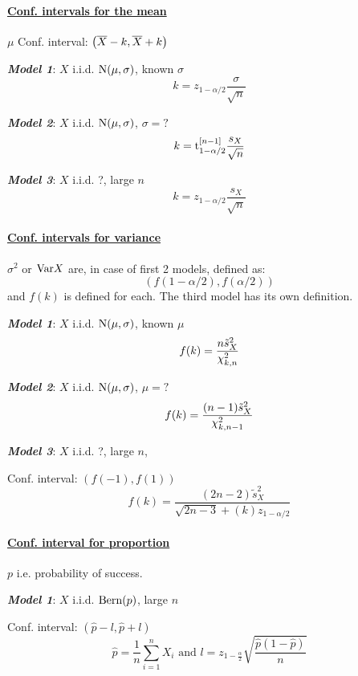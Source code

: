 \paragraph{\underline{Conf. intervals for the mean}}
$\mu$ \hspace{0pt} \newline
Conf. interval: $ \left( \overline{X} - k, \overline{X} + k \right) $

\vspace{5pt} \noindent \textbf{\em Model 1}:
$X$ i.i.d. $\textrm{N}(\mu, \sigma)$, known $\sigma$
\[ k = z_{1-\alpha/2}\frac{\sigma}{\sqrt{n}} \]

\noindent \textbf{\em Model 2}:
$X$ i.i.d. $\textrm{N}(\mu, \sigma)$, $\sigma=?$
\[ k = \textrm{t}^{[n-1]}_{1-\alpha/2}\frac{s_X}{\sqrt{n}} \]

\noindent \textbf{\em Model 3}:
$X$ i.i.d. ?, large $n$
\[ k = z_{1-\alpha/2}\frac{s_X}{\sqrt{n}} \]

\paragraph{\underline{Conf. intervals for variance}}
$\sigma^2$ \hspace{0pt} \newline
or $\textrm{Var} X$ are, in case of first 2 models, defined as:
\[ \left( f(1-\alpha/2), f(\alpha/2) \right) \]
and $f(k)$ is defined for each. The third model has its own definition.

\vspace{5pt} \noindent \textbf{\em Model 1}:
$X$ i.i.d. $\textrm{N}(\mu, \sigma)$, known $\mu$
\[ f(k) = \frac{n\tilde{s}_X^2}{\chi^2_{k,n}} \]

\noindent \textbf{\em Model 2}:
$X$ i.i.d. $\textrm{N}(\mu, \sigma)$, $\mu=?$
\[ f(k) = \frac{(n-1)\tilde{s}_X^2}{\chi^2_{k,n-1}} \]

\noindent \textbf{\em Model 3}:
$X$ i.i.d. ?, large $n$,

Conf. interval: $ \left( f(-1) , f(1) \right) $
\[ f(k) = \frac{(2n-2)\tilde{s}_X^2}{\sqrt{2n-3} + (k)z_{1-\alpha/2}} \]

\paragraph{\underline{Conf. interval for proportion}}
$p$ \hspace{0pt} \newline
i.e. probability of success.

\vspace{5pt} \noindent \textbf{\em Model 1}:
$X$ i.i.d. $\textrm{Bern}(p)$, large $n$

Conf. interval: $ \left( \hat{p}-l , \hat{p}+l \right) $
\[ \hat{p} = \frac{1}{n} \sum_{i=1}^n X_i \mbox{ and }
l = z_{1-\frac{\alpha}{2}}\sqrt{\frac{\hat{p}(1-\hat{p})}{n}} \]

